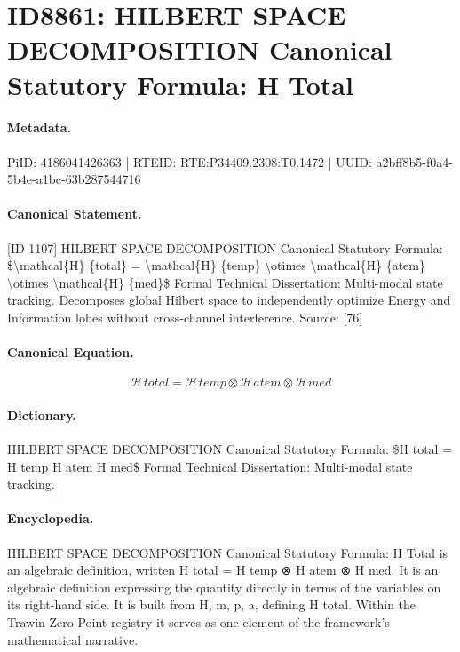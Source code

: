 \section*{ID8861: HILBERT SPACE DECOMPOSITION Canonical Statutory Formula: H Total}
\paragraph{Metadata.}
PiID: 4186041426363 | RTEID: RTE:P34409.2308:T0.1472 | UUID: a2bff8b5-f0a4-5b4e-a1bc-63b287544716

\paragraph{Canonical Statement.}
[ID 1107] HILBERT SPACE DECOMPOSITION Canonical Statutory Formula: \$\textbackslash{}mathcal\{H\} \{total\} = \textbackslash{}mathcal\{H\} \{temp\} \textbackslash{}otimes \textbackslash{}mathcal\{H\} \{atem\} \textbackslash{}otimes \textbackslash{}mathcal\{H\} \{med\}\$ Formal Technical Dissertation: Multi-modal state tracking. Decomposes global Hilbert space to independently optimize Energy and Information lobes without cross-channel interference. Source: [76]

\paragraph{Canonical Equation.}
\[
\mathcal{H} {total} = \mathcal{H} {temp} \otimes \mathcal{H} {atem} \otimes \mathcal{H} {med}
\]

\paragraph{Dictionary.}
HILBERT SPACE DECOMPOSITION Canonical Statutory Formula: \$H total = H temp H atem H med\$ Formal Technical Dissertation: Multi-modal state tracking.

\paragraph{Encyclopedia.}
HILBERT SPACE DECOMPOSITION Canonical Statutory Formula: H Total is an algebraic definition, written H total = H temp ⊗ H atem ⊗ H med. It is an algebraic definition expressing the quantity directly in terms of the variables on its right-hand side. It is built from H, m, p, a, defining H total. Within the Trawin Zero Point registry it serves as one element of the framework's mathematical narrative.
